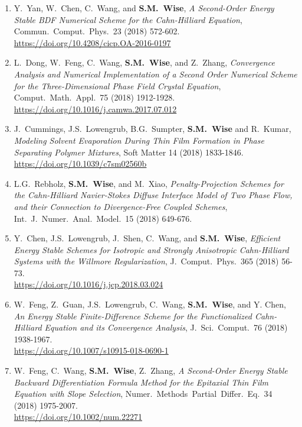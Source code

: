 \documentclass[11pt]{letter}
\begin{document}
\begin{enumerate}
	\item
Y.~Yan, W.~Chen, C.~Wang, and \textbf{S.M.~Wise}, {\sl A Second-Order Energy Stable BDF Numerical Scheme for the Cahn-Hilliard Equation}, Commun.~Comput.~Phys.~23 (2018) 572-602.
	\\ 
\url{https://doi.org/10.4208/cicp.OA-2016-0197}


	\item
L.~Dong, W.~Feng, C.~Wang, \textbf{S.M.~Wise}, and Z.~Zhang, {\sl Convergence Analysis and Numerical Implementation of a Second Order Numerical Scheme for the Three-Dimensional Phase Field Crystal Equation}, Comput.~Math.~Appl.~75 (2018) 1912-1928.
	\\ 
\url{https://doi.org/10.1016/j.camwa.2017.07.012}

	\item
J.~Cummings, J.S.~Lowengrub, B.G.~Sumpter, \textbf{S.M.~Wise} and R.~Kumar, {\sl Modeling Solvent Evaporation During Thin Film Formation in Phase Separating Polymer Mixtures}, Soft Matter 14 (2018) 1833-1846.
	\\ 
\url{https://doi.org/10.1039/c7sm02560b}

	\item
L.G.~Rebholz, \textbf{S.M.~Wise}, and M.~Xiao, {\it Penalty-Projection Schemes for the Cahn-Hilliard Navier-Stokes Diffuse Interface Model of Two Phase Flow, and their Connection to Divergence-Free Coupled Schemes}, Int.~J.~Numer.~Anal.~Model.~15 (2018) 649-676.

	\item
Y.~Chen, J.S.~Lowengrub, J.~Shen, C.~Wang, and \textbf{S.M.~Wise}, {\sl Efficient Energy Stable Schemes for Isotropic and Strongly Anisotropic Cahn-Hilliard Systems with the Willmore Regularization}, J.~Comput.~Phys.~365 (2018) 56-73.
	\\
\url{https://doi.org/10.1016/j.jcp.2018.03.024}

	\item
W.~Feng, Z.~Guan, J.S.~Lowengrub, C.~Wang, \textbf{S.M.~Wise}, and Y. Chen, {\sl An Energy Stable Finite-Difference Scheme for the Functionalized Cahn-Hilliard Equation and its Convergence Analysis}, J.~Sci.~Comput.~76 (2018) 1938-1967.
	\\ 
\url{https://doi.org/10.1007/s10915-018-0690-1}

	\item
W.~Feng, C.~Wang, \textbf{S.M.~Wise},  Z.~Zhang, {\sl A Second-Order Energy Stable Backward Differentiation Formula Method for the Epitaxial Thin Film Equation with Slope Selection}, Numer.~Methods~Partial~Differ.~Eq.~34 (2018) 1975-2007.
	\\ 
\url{https://doi.org/10.1002/num.22271}


\end{enumerate}
\end{document}
